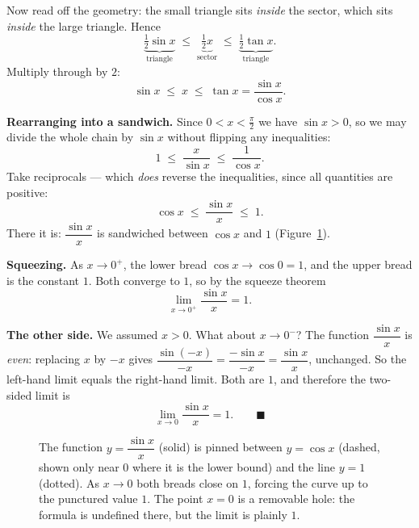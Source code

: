 Now read off the geometry: the small triangle sits \emph{inside} the sector,
which sits \emph{inside} the large triangle. Hence
\[
  \underbrace{\tfrac12\sin x}_{\text{triangle}}
  \;\le\;
  \underbrace{\tfrac12 x}_{\text{sector}}
  \;\le\;
  \underbrace{\tfrac12\tan x}_{\text{triangle}}.
\]
Multiply through by $2$:
\[
  \sin x \;\le\; x \;\le\; \tan x = \frac{\sin x}{\cos x}.
\]

\textbf{Rearranging into a sandwich.} Since $0<x<\frac\pi2$ we have
$\sin x > 0$, so we may divide the whole chain by $\sin x$ without flipping any
inequalities:
\[
  1 \;\le\; \frac{x}{\sin x} \;\le\; \frac{1}{\cos x}.
\]
Take reciprocals --- which \emph{does} reverse the inequalities, since all
quantities are positive:
\[
  \cos x \;\le\; \frac{\sin x}{x} \;\le\; 1.
\]
There it is: $\dfrac{\sin x}{x}$ is sandwiched between $\cos x$ and $1$
(Figure~\ref{ch07:fig-sinx}).

\textbf{Squeezing.} As $x\to 0^{+}$, the lower bread $\cos x \to \cos 0 = 1$,
and the upper bread is the constant $1$. Both converge to $1$, so by the
squeeze theorem
\[
  \lim_{x\to 0^{+}}\frac{\sin x}{x} = 1.
\]

\textbf{The other side.} We assumed $x>0$. What about $x\to 0^{-}$? The
function $\dfrac{\sin x}{x}$ is \emph{even}: replacing $x$ by $-x$ gives
$\dfrac{\sin(-x)}{-x} = \dfrac{-\sin x}{-x} = \dfrac{\sin x}{x}$, unchanged. So
the left-hand limit equals the right-hand limit. Both are $1$, and therefore
the two-sided limit is
\[
  \lim_{x\to 0}\frac{\sin x}{x} = 1. \qquad\blacksquare
\]

\begin{figure}[h]
\centering
{}
\caption{The function $y=\dfrac{\sin x}{x}$ (solid) is pinned between
$y=\cos x$ (dashed, shown only near $0$ where it is the lower bound) and the
line $y=1$ (dotted). As $x\to 0$ both breads close on $1$, forcing the curve up
to the punctured value $1$. The point $x=0$ is a removable hole: the formula is
undefined there, but the limit is plainly $1$.}
\label{ch07:fig-sinx}
\end{figure}

